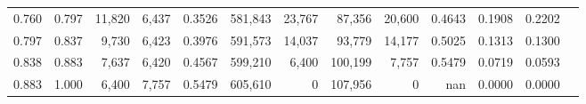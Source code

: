\begin{tabular}{rrrrrrrrrrrrr}
0.760 & 0.797 &  11,820 & 6,437 &                                     0.3526 & 581,843 &  23,767 &  87,356 &  20,600 & 0.4643 & 0.1908 & 0.2202 \\
0.797 & 0.837 &   9,730 & 6,423 &                                     0.3976 & 591,573 &  14,037 &  93,779 &  14,177 & 0.5025 & 0.1313 & 0.1300 \\
0.838 & 0.883 &   7,637 & 6,420 &                                     0.4567 & 599,210 &   6,400 & 100,199 &   7,757 & 0.5479 & 0.0719 & 0.0593 \\
0.883 & 1.000 &   6,400 & 7,757 &                                     0.5479 & 605,610 &       0 & 107,956 &       0 &    nan & 0.0000 & 0.0000 \\
\bottomrule
\end{tabular}
